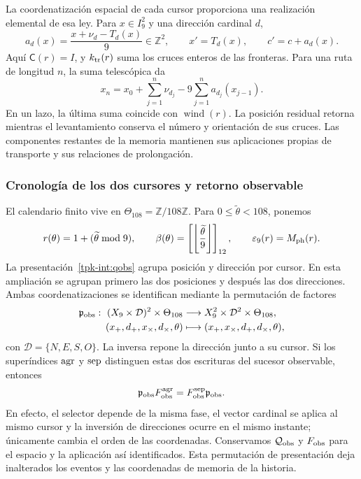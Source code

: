 La coordenatización espacial de cada cursor proporciona una realización elemental
de esa ley. Para \(x\in I_9^2\) y una dirección cardinal \(d\),
\[
 a_d(x)=\frac{x+\nu_d-T_d(x)}9\in\mathbb Z^2,
 \qquad x'=T_d(x),\qquad c'=c+a_d(x).
\]
Aquí \(\mathsf C(r)=I\), y \(k_{\rm tr}(r)\) suma los
cruces enteros de las fronteras. Para una ruta de longitud \(n\),
la suma telescópica da
\[
 x_n=x_0+\sum_{j=1}^n\nu_{d_j}
             -9\sum_{j=1}^n a_{d_j}(x_{j-1}).
\]
En un lazo, la última suma coincide con
\(\operatorname{wind}(r)\). La posición residual retorna mientras
el levantamiento conserva el número y orientación de sus cruces.
Las componentes restantes de la memoria mantienen sus aplicaciones
propias de transporte y sus relaciones de prolongación.

\subsubsection{Cronología de los dos cursores y retorno observable}

El calendario finito vive en \(\Theta_{108}=\mathbb Z/108\mathbb Z\).
Para \(0\leq\widetilde\theta<108\), ponemos
\[
 r(\theta)=1+(\widetilde\theta\bmod9),\qquad
 \beta(\theta)=\left[\left\lfloor\frac{\widetilde\theta}{9}
 \right\rfloor\right]_{12},\qquad
 \varepsilon_9(r)=M_{\rm ph}(r).
\]
La presentación~\eqref{tpk-int:qobs} agrupa posición y dirección por
cursor. En esta ampliación se agrupan primero las dos posiciones y
después las dos direcciones. Ambas coordenatizaciones se identifican mediante la
permutación de factores
\begin{equation}
 \begin{aligned}
 \mathfrak p_{\rm obs}:\ (X_9\times\mathcal D)^2\times\Theta_{108}
 &\longrightarrow X_9^2\times\mathcal D^2\times\Theta_{108},\\
 (x_+,d_+,x_\times,d_\times,\theta)
 &\longmapsto(x_+,x_\times,d_+,d_\times,\theta),
 \end{aligned}
 \label{ii:permutacion-coordenadas-observables}
\end{equation}
con \(\mathcal D=\{N,E,S,O\}\). La inversa repone la dirección junto
a su cursor. Si los superíndices \({\rm agr}\) y \({\rm sep}\) distinguen
estas dos escrituras del sucesor observable, entonces
\[
 \mathfrak p_{\rm obs}F_{\rm obs}^{\rm agr}
 =F_{\rm obs}^{\rm sep}\mathfrak p_{\rm obs}.
\]
En efecto, el selector depende de la misma fase, el vector cardinal se
aplica al mismo cursor y la inversión de direcciones ocurre en el mismo
instante; únicamente cambia el orden de las coordenadas. Conservamos
\(\mathcal Q_{\rm obs}\) y \(F_{\rm obs}\) para el espacio y la
aplicación así identificados. Esta permutación de presentación deja
inalterados los eventos y las coordenadas de memoria de la historia.

